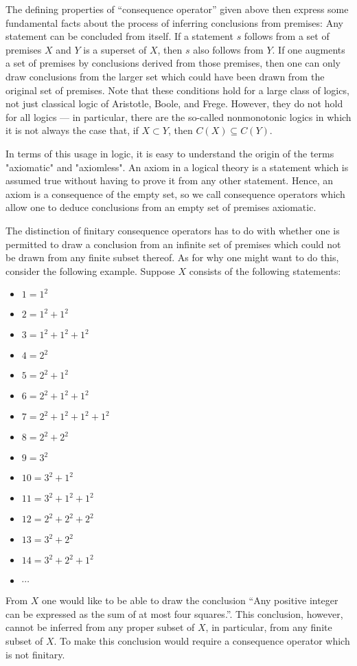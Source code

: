 \documentclass[12pt]{article}
\begin{document}
The defining properties of ``consequence operator'' given above then express
some fundamental facts about the process of inferring conclusions from 
premises:  Any statement can be concluded from itself.  If a statement $s$ 
follows from a set of premises $X$ and $Y$ is a superset of $X$, then
$s$ also follows from $Y$.  If one augments a set of premises by conclusions
derived from those premises, then one can only draw conclusions from the 
larger set which could have been drawn from the original set of premises.
Note that these conditions hold for a large class of logics, not just 
classical logic of  Aristotle, Boole, and Frege.  However, they do not hold 
for all logics ---  in particular, there are the so-called nonmonotonic 
logics in which it is not always the case that, if $X \subset Y$, then 
$C(X) \subseteq C(Y)$.

In terms of this usage in logic, it is easy to understand the origin of the
terms "axiomatic" and "axiomless".   An axiom in a logical theory is a 
statement which is assumed true without having to prove it from any other
statement.  Hence, an axiom is a consequence of the empty set, so we call
consequence operators which allow one to deduce conclusions from an empty
set of premises axiomatic.

The distinction of finitary consequence operators has to do with whether one
is permitted to draw a conclusion from an infinite set of premises which
could not be drawn from any finite subset thereof.  As for why one might
want to do this, consider the following example.  Suppose $X$ consists of
the following statements:
\begin{itemize}
\item $1 = 1^2$
\item $2 = 1^2 + 1^2$
\item $3 = 1^2 + 1^2 + 1^2$
\item $4 = 2^2$
\item $5 = 2^2 + 1^2$
\item $6 = 2^2 + 1^2 + 1^2$
\item $7 = 2^2 + 1^2 + 1^2 + 1^2$
\item $8 = 2^2 + 2^2$
\item $9 = 3^2$
\item $10 = 3^2 + 1^2$
\item $11 = 3^2 + 1^2 + 1^2$
\item $12 = 2^2 + 2^2 + 2^2$
\item $13 = 3^2 + 2^2$
\item $14 = 3^2 + 2^2 + 1^2$
\item $\cdots$
\end{itemize}
From $X$ one would like to be able to draw the conclusion ``Any positive
integer can be expressed as the sum of at most four squares.''.  This 
conclusion, however, cannot be inferred from any proper subset of $X$, in
particular, from any finite subset of $X$.  To make this conclusion would
require a consequence operator which is not finitary.
\end{document}

